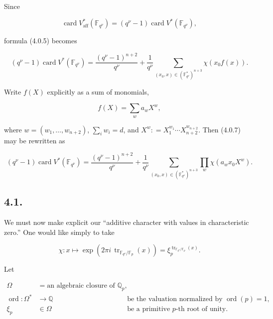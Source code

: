 Since

\begin{equation}\tag{4.0.6}
\operatorname{card}V^*_{\mathrm{aff}}(\mathbb F_{q^\nu})
=(q^\nu-1)\operatorname{card}V^*(\mathbb F_{q^\nu}),
\end{equation}

formula (4.0.5) becomes

\begin{equation}\tag{4.0.7}
(q^\nu-1)\operatorname{card}V^*(\mathbb F_{q^\nu})
=\frac{(q^\nu-1)^{n+2}}{q^\nu}
+\frac1{q^\nu}
\sum_{(x_0,x)\in(\mathbb F_{q^\nu}^*)^{n+3}}\chi(x_0f(x)).
\end{equation}

Write $f(X)$ explicitly as a sum of monomials,

\begin{equation}\tag{4.0.8}
f(X)=\sum_w a_wX^w,
\end{equation}

where $w=(w_1,\ldots,w_{n+2})$, $\sum_iw_i=d$, and
$X^w\mathrel{\mathop:}=X_1^{w_1}\cdots X_{n+2}^{w_{n+2}}$. Then (4.0.7)
may be rewritten as

\begin{equation}\tag{4.0.9}
(q^\nu-1)\operatorname{card}V^*(\mathbb F_{q^\nu})
=\frac{(q^\nu-1)^{n+2}}{q^\nu}
+\frac1{q^\nu}
\sum_{(x_0,x)\in(\mathbb F_{q^\nu}^*)^{n+3}}
\prod_w\chi(a_wx_0X^w).
\end{equation}

\subsection*{4.1.}
We must now make explicit our ``additive character with values in
characteristic zero.'' One would like simply to take

\begin{equation}\tag{4.1.0}
\chi:x\longmapsto
\exp\!\left(2\pi i\,\operatorname{tr}_{\mathbb F_{q^\nu}/\mathbb F_p}(x)\right)
=\xi_p^{\operatorname{tr}_{\mathbb F_{q^\nu}/\mathbb F_p}(x)}.
\end{equation}

Let

\begin{align}
\tag{4.1.1}
\Omega&=\text{an algebraic closure of }\mathbb Q_p,\\
\tag{4.1.2}
\operatorname{ord}:\Omega^*&\longrightarrow\mathbb Q
  &&\text{be the valuation normalized by }\operatorname{ord}(p)=1,\\
\tag{4.1.3}
\xi_p&\in\Omega
  &&\text{be a primitive $p$-th root of unity.}
\end{align}

